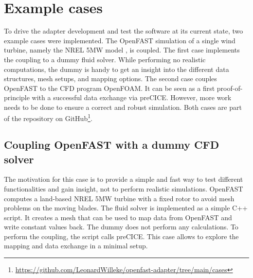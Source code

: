 \section{Example cases}
\label{section:cases}

To drive the adapter development and test the software at its current state, two example cases were implemented. The OpenFAST simulation of a single wind turbine, namely the NREL 5MW model \cite{Jonkman:2009}, is coupled. The first case implements the coupling to a dummy fluid solver. While performing no realistic computations, the dummy is handy to get an insight into the different data structures, mesh setups, and mapping options. The second case couples OpenFAST to the CFD program OpenFOAM. It can be seen as a first proof-of-principle with a successful data exchange via preCICE. However, more work needs to be done to ensure a correct and robust simulation. Both cases are part of the repository on GitHub\footnote{\url{https://github.com/LeonardWilleke/openfast-adapter/tree/main/cases}}.

\subsection{Coupling OpenFAST with a dummy CFD solver}

The motivation for this case is to provide a simple and fast way to test different functionalities and gain insight, not to perform realistic simulations. OpenFAST computes a land-based NREL 5MW turbine with a fixed rotor to avoid mesh problems on the moving blades. The fluid solver is implemented as a simple C++ script. It creates a mesh that can be used to map data from OpenFAST and write constant values back. The dummy does not perform any calculations. To perform the coupling, the script calls preCICE. This case allows to explore the mapping and data exchange in a minimal setup.

